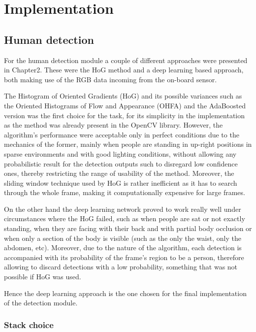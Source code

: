 \chapter{Implementation}
\label{chapter3}

\section{Human detection}

For the human detection module a couple of different approaches were presented in Chapter2. These were the HoG method and a deep learning based approach, both making use of the RGB data incoming from the on-board sensor.

The Histogram of Oriented Gradients (HoG) and its possible variances such as the Oriented Histograms of Flow and Appearance (OHFA) and the AdaBoosted version was the first choice for the task, for its simplicity in the implementation as the method was already present in the OpenCV library. However, the algorithm's performance were acceptable only in perfect conditions due to the mechanics of the former, mainly when people are standing in up-right positions in sparse environments and with good lighting conditions, without allowing any probabilistic result for the detection outputs such to disregard low confidence ones, thereby restricting the range of usability of the method. Moreover, the sliding window technique used by HoG is rather inefficient as it has to search through the whole frame, making it computationally expensive for large frames.

On the other hand the deep learning network proved to work really well under circumstances where the HoG failed, such as when people are sat or not exactly standing, when they are facing with their back and with partial body occlusion or when only a section of the body is visible (such as the only the waist, only the abdomen, etc). Moreover, due to the nature of the algorithm, each detection is accompanied with its probability of the frame's region to be a person, therefore allowing to discard detections with a low probability, something that was not possible if HoG was used.

Hence the deep learning approach is the one chosen for the final implementation of the detection module.

\subsection{Stack choice}

